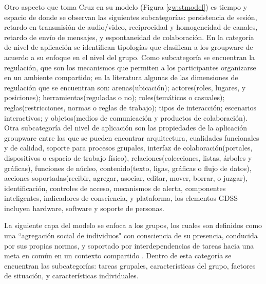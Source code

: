 Otro aspecto que toma Cruz en su modelo (Figura \ref{gw:stmodel}) es tiempo y espacio de donde se observan las siguientes subcategor\'ias: persistencia de sesi\'on, retardo en transmisi\'on de audio/video, reciprocidad y homogeneidad de canales, retardo de env\'io de mensajes, y espontaneidad de colaboraci\'on. En la categor\'ia de nivel de aplicaci\'on se identifican tipolog\'ias que clasifican a los groupware de acuerdo a su enfoque en el nivel del grupo. Como subcategor\'ia se encuentran la regulaci\'on, que son los mecanismos que permiten a los participantes organizarse en un ambiente compartido; en la literatura algunas de las dimensiones de regulaci\'on que se encuentran son: arenas(ubicaci\'on); actores(roles, lugares, y posiciones); herramientas(reguladas o no); roles(tem\'aticos o casuales); reglas(restricciones, normas o reglas de trabajo); tipos de interacci\'on; escenarios interactivos; y objetos(medios de comunicaci\'on y productos de colaboraci\'on). Otra subcategor\'ia del nivel de aplicaci\'on son las propiedades de la aplicaci\'on groupware entre las que se pueden encontrar arquitectura, cualidades funcionales y de calidad, soporte para procesos grupales, interfaz de colaboraci\'on(portales, dispositivos o espacio de trabajo f\'isico), relaciones(colecciones, listas, \'arboles y gr\'aficas), funciones de n\'ucleo, contenido(texto, ligas, gr\'aficas o flujo de datos), acciones soportadas(recibir, agregar, asociar, editar, mover, borrar, o juzgar), identificaci\'on, controles de acceso, mecanismos de alerta, componentes inteligentes, indicadores de consciencia, y plataforma, los elementos GDSS incluyen hardware, software y soporte de personas.

La siguiente capa del modelo se enfoca a los grupos, los cuales son definidos como una ``agregaci\'on social de individuos" con consciencia de su presencia, conducida por sus propias normas, y soportado por interdependencias de tareas hacia una meta en com\'un en un contexto compartido \citep{pumareja2002evolutionary}. Dentro de esta categor\'ia se encuentran las subcategor\'ias: tareas grupales, caracter\'isticas del grupo, factores de situaci\'on, y caracter\'isticas individuales.

